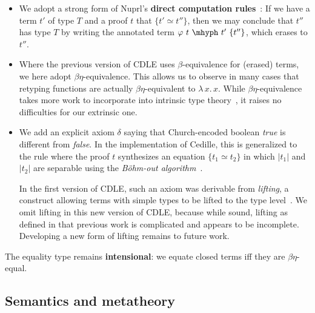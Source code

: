 \documentclass{article}
\newcommand{\absu}[3]{{#1}\, #2.\, #3}
\begin{document}
\begin{itemize}
\item We adopt a strong form of Nuprl's \textbf{direct computation rules}~\cite{constable+86}:
  If we have a term $t'$ of type $T$ and a proof $t$ that $\{ t' \simeq t''\}$, then we may conclude that
  $t''$ has type $T$ by writing the annotated term $\varphi\ t\ \mhyph\ t'\ \{t''\}$, which
  erases to $t''$.
\item Where the previous version of CDLE uses $\beta$-equivalence for (erased)
  terms, we here adopt $\beta\eta$-equivalence.
  This allows us to observe in many cases that retyping functions are actually
  $\beta\eta$-equivalent to $\absu{\lambda}{x}{x}$. 
  While $\beta\eta$-equivalence takes more work to incorporate into intrinsic
  type theory~\cite{geuvers92}, it raises no difficulties for our extrinsic one.
\item We add an explicit axiom $\delta$ saying that
  Church-encoded boolean \emph{true} is different from \emph{false}.
  In the implementation of Cedille, this is generalized to the rule where the
  proof \(t\) synthesizes an equation \(\{t_1 \simeq t_2\}\) in which \(|t_1|\)
  and \(|t_2|\) are separable using the \emph{B\"ohm-out algorithm}~\cite{BDPR79_Bohm-Algorithm}.

  In the first version of CDLE, such an axiom was derivable from \emph{lifting},
  a construct allowing terms with simple types to be lifted to the type
  level~\cite{stump17}.
  We omit lifting in this new version of CDLE, because while
  sound, lifting as defined in that previous work is complicated and appears to be incomplete.  Developing a new
  form of lifting remains to future work.
\end{itemize}

The equality type remains \textbf{intensional}: we equate closed terms iff they
are $\beta\eta$-equal.

\subsection{Semantics and metatheory}
\end{document}
